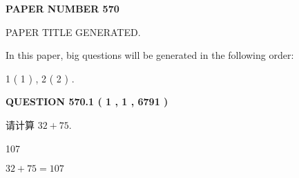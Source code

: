 \documentclass{ctexart}
\begin{document}
   
   
   
\newpage 
\setcounter{page}{ 
   570001 } 
   
   
   
   
 {\textbf{ \Large{ PAPER NUMBER  570  }}}
   
   
\vspace{0.2in}
   
   
   
   
   
   
   
   
 \vspace{0.2in}
 
 
 
 
   
   
 PAPER TITLE GENERATED.
   
   
   
\vspace{0.2in}
   
In this paper, big questions will be generated in the following order: 
   
   
   1 ( 1 )
 ,
   2 ( 2 )
 .
  
\vspace{0.2in}
  
{\textbf{\Large{QUESTION
570.1 
 ( 1 , 1 , 6791 )
}}}
  
  
 
请计算 $ %
32 +  %
75 $.
 
 
 
\noindent{}
 
 

107
 
 
\noindent{}
 
 

 
 
 
\noindent{}
 
 

$ %
32 +  %
75=   %
107$
 
 
\noindent{}
 
 

 
   
   
   
\end{document}

